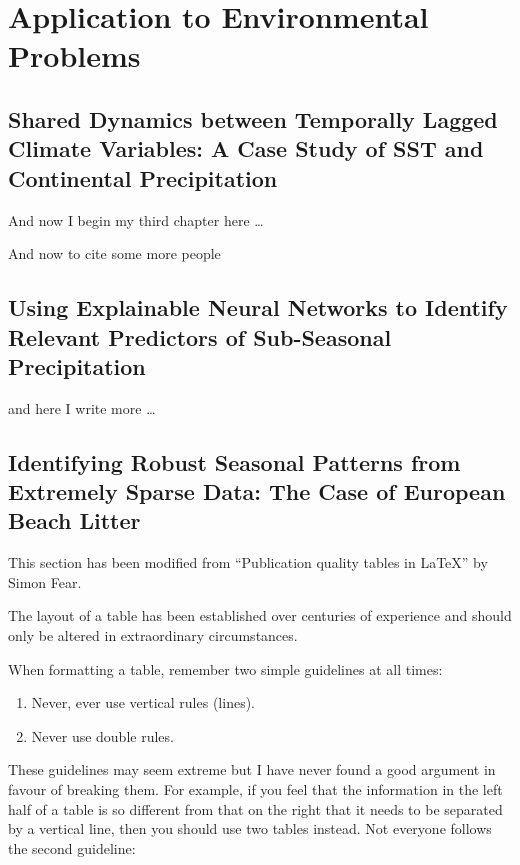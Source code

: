 \chapter{Application to Environmental Problems}

\ifpdf
    \graphicspath{{Chapter3/Figs/Raster/}{Chapter3/Figs/PDF/}{Chapter3/Figs/}}
\else
    \graphicspath{{Chapter3/Figs/Vector/}{Chapter3/Figs/}}
\fi

\section{Shared Dynamics between Temporally Lagged Climate Variables: A Case Study of SST and Continental Precipitation}
And now I begin my third chapter here \dots

And now to cite some more people~\citet{Rea85,Ancey1996}

\section{Using Explainable Neural Networks to Identify Relevant Predictors of Sub-Seasonal Precipitation}
and here I write more \dots

\section{Identifying Robust Seasonal Patterns from Extremely Sparse Data: The Case of European Beach Litter}
This section has been modified from ``Publication quality tables in \LaTeX*''
 by Simon Fear.

The layout of a table has been established over centuries of experience and 
should only be altered in extraordinary circumstances. 

When formatting a table, remember two simple guidelines at all times:

\begin{enumerate}
  \item Never, ever use vertical rules (lines).
  \item Never use double rules.
\end{enumerate}

These guidelines may seem extreme but I have
never found a good argument in favour of breaking them. For
example, if you feel that the information in the left half of
a table is so different from that on the right that it needs
to be separated by a vertical line, then you should use two
tables instead. Not everyone follows the second guideline:

